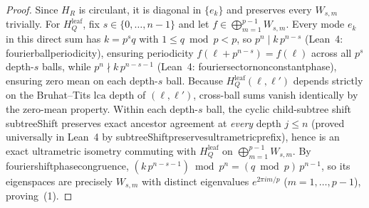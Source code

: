 \documentclass[11pt,a4paper]{article}
\numberwithin{equation}{section}
\theoremstyle{plain}
\theoremstyle{definition}
\theoremstyle{remark}
\newcommand{\lca}{\mathrm{lca}}
\newcommand{\code}[1]{{\ttfamily\footnotesize\def\_{\textunderscore\penalty0\hskip0pt}#1}}
\begin{document}
\begin{proof}
Since $H_R$ is circulant, it is diagonal in $\{e_k\}$ and preserves every $W_{s,m}$ trivially. For $H_Q^{\mathrm{leaf}}$, fix $s \in \{0,\dots,n-1\}$ and let $f \in \bigoplus_{m=1}^{p-1} W_{s,m}$. Every mode $e_k$ in this direct sum has $k = p^s q$ with $1 \le q\bmod p < p$, so $p^n \mid k\,p^{n-s}$ (Lean~4: \code{fourier\_ball\_periodicity}), ensuring periodicity $f(\ell + p^{n-s}) = f(\ell)$ across all $p^s$ depth-$s$ balls, while $p^n \nmid k\,p^{n-s-1}$ (Lean~4: \code{fourier\_sector\_nonconstant\_phase}), ensuring zero mean on each depth-$s$ ball. Because $H_Q^{\mathrm{leaf}}(\ell, \ell')$ depends strictly on the Bruhat--Tits $\lca$ depth of $(\ell, \ell')$, cross-ball sums vanish identically by the zero-mean property. Within each depth-$s$ ball, the cyclic child-subtree shift \code{subtreeShift} preserves exact ancestor agreement at \emph{every} depth $j \le n$ (proved universally in Lean~4 by \code{subtreeShift\_preserves\_ultrametric\_prefix}), hence is an exact ultrametric isometry commuting with $H_Q^{\mathrm{leaf}}$ on $\bigoplus_{m=1}^{p-1} W_{s,m}$. By \code{fourier\_shift\_phase\_congruence}, $(k\,p^{n-s-1}) \bmod p^n = (q \bmod p)\,p^{n-1}$, so its eigenspaces are precisely $W_{s,m}$ with distinct eigenvalues $e^{2\pi i m / p}$ ($m=1,\dots,p-1$), proving~(1).


\end{proof}
\end{document}
